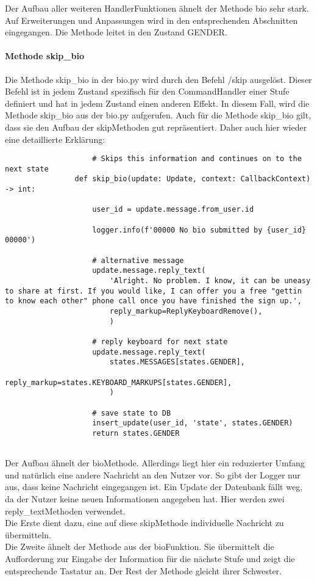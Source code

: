                 Der Aufbau aller weiteren Handler\-Funktionen ähnelt der Methode bio sehr stark. Auf Erweiterungen und Anpassungen wird in den entsprechenden Abschnitten eingegangen. Die Methode leitet in den Zustand GENDER.

            \paragraph{Methode skip\_bio}
                Die Methode skip\_bio in der bio.py wird durch den Befehl /skip ausgelöst. Dieser Befehl ist in jedem Zustand spezifisch für den CommandHandler einer Stufe definiert und hat in jedem Zustand einen anderen Effekt. In diesem Fall, wird die Methode skip\_bio aus der bio.py aufgerufen. Auch für die Methode skip\_bio gilt, dass sie den Aufbau der skip\-Methoden gut repräsentiert. Daher auch hier wieder eine detaillierte Erklärung:\\

                \begin{verbatim}
                    # Skips this information and continues on to the next state
                def skip_bio(update: Update, context: CallbackContext) -> int:
                    
                    user_id = update.message.from_user.id

                    logger.info(f'00000 No bio submitted by {user_id} 00000')

                    # alternative message
                    update.message.reply_text(
                        'Alright. No problem. I know, it can be uneasy to share at first. If you would like, I can offer you a free "gettin to know each other" phone call once you have finished the sign up.',
                        reply_markup=ReplyKeyboardRemove(),
                        )

                    # reply keyboard for next state
                    update.message.reply_text(
                        states.MESSAGES[states.GENDER],
                        reply_markup=states.KEYBOARD_MARKUPS[states.GENDER],
                        )    

                    # save state to DB
                    insert_update(user_id, 'state', states.GENDER)
                    return states.GENDER
                
                \end{verbatim} 

                Der Aufbau ähnelt der bio\-Methode. Allerdings liegt hier ein reduzierter Umfang und natürlich eine andere Nachricht an den Nutzer vor. So gibt der Logger nur aus, dass keine Nachricht eingegangen ist. Ein Update der Datenbank fällt weg, da der Nutzer keine neuen Informationen angegeben hat. Hier werden zwei reply\_text\-Methoden verwendet. \\
                Die Erste dient dazu, eine auf diese skip\-Methode individuelle Nachricht zu übermitteln. \\
                Die Zweite ähnelt der Methode aus der bio\-Funktion. Sie übermittelt die Aufforderung zur Eingabe der Information für die nächste Stufe und zeigt die entsprechende Tastatur an. Der Rest der Methode gleicht ihrer Schwester.


